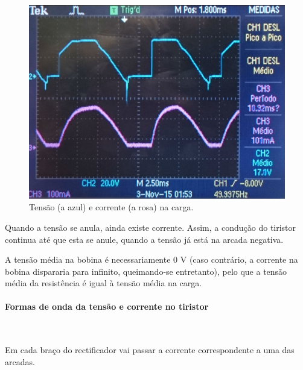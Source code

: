 \documentclass[a4paper,11pt]{article}
\numberwithin{equation}{section}
\begin{document}
\begin{figure}[H]
	\centering
	\includegraphics[keepaspectratio=true, scale=0.15]{img/DSC_0184}
	\caption{Tensão (a azul) e corrente (a rosa) na carga.}
	\label{fig:tcentradalacuna}
	\vspace{-0.8em}
\end{figure}

Quando a tensão se anula, ainda existe corrente. Assim, a condução do tiristor continua até que esta se anule, quando a tensão já está na arcada negativa.

A tensão média na bobina é necessariamente $0$ V (caso contrário, a corrente na bobina dispararia para infinito, queimando-se entretanto), pelo que a tensão média da resistência é igual à tensão média na carga.

\paragraph{Formas de onda da tensão e corrente no tiristor} \mbox{}\

Em cada braço do rectificador vai passar a corrente correspondente a uma das arcadas.
\end{document}

